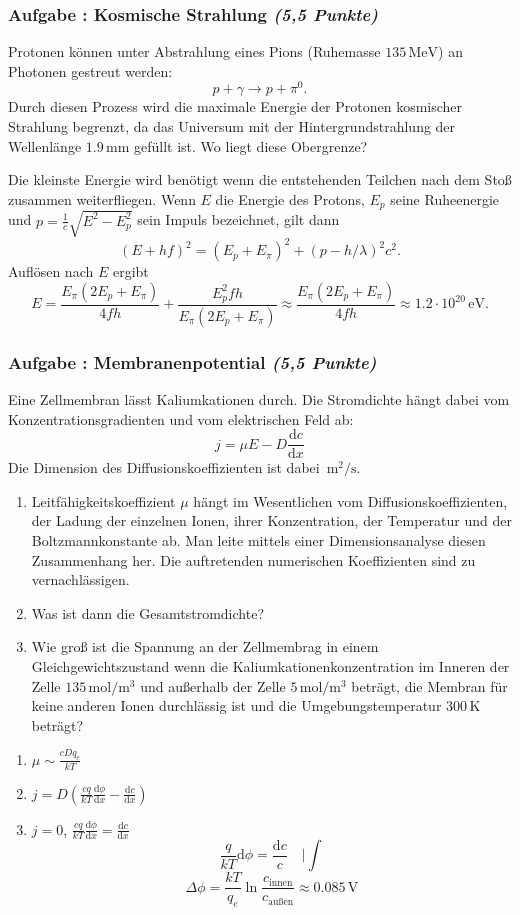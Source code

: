 \documentclass[12pt,a4paper]{article}
\newcommand{\ee}[1]{\cdot 10^{#1}}
\newcommand{\unit}[1]{\,\mathrm{#1}}
\newcommand{\dif}{\mathrm{d}}
\newcommand{\tdif}[2]{\frac{\dif#1}{\dif#2}}
\newenvironment{abcenum}{\renewcommand{\labelenumi}{(\alph{enumi})} \begin{enumerate}}{\end{enumerate}\renewcommand{\labelenumi}{\theenumi .}}
\newcounter{numlabel}
\newenvironment{problem}[2]{\stepcounter{numlabel} \vspace{1ex} \subsubsection*{Aufgabe \the\value{numlabel}: #1 \emph{(#2 Punkte)}} \renewcommand{\Currentlabel}{Aufgabe \the\value{numlabel}: #1}}{

}
\begin{document}
\begin{problem}{Kosmische Strahlung}{5,5}
Protonen können unter Abstrahlung eines Pions (Ruhemasse $135 \unit{MeV}$) an Photonen gestreut werden:
\[
p + \gamma \rightarrow p + \pi^0.
\]
Durch diesen Prozess wird die maximale Energie der Protonen kosmischer Strahlung begrenzt, da das Universum mit der Hintergrundstrahlung der Wellenlänge $1.9 \unit{mm}$ gefüllt ist. Wo liegt diese Obergrenze?

\begin{solution}
Die kleinste Energie wird benötigt wenn die entstehenden Teilchen nach dem Stoß zusammen weiterfliegen. Wenn $E$ die Energie des Protons, $E_p$ seine Ruheenergie und $p = \frac1c \sqrt{E^2 - E_p^2}$ sein Impuls bezeichnet, gilt dann
\[
(E+hf)^2 = (E_p + E_\pi)^2 + (p- h/\lambda)^2 c^2.
\]
Auflösen nach $E$ ergibt
\[
E = \frac{E_\pi (2 E_p + E_\pi)}{4 f h} + \frac{E_p^2 f h}{E_\pi (2 E_p +E_\pi)} \approx \frac{E_\pi (2 E_p + E_\pi)}{4 f h} \approx 1.2\ee{20} \unit{eV}.
\]
\end{solution}
\end{problem}


\begin{problem}{Membranenpotential}{5,5}
Eine Zellmembran lässt Kaliumkationen durch. Die Stromdichte hängt dabei vom Konzentrationsgradienten und vom elektrischen Feld ab:
\[
j = \mu E - D \tdif{c}{x}
\]
Die Dimension des Diffusionskoeffizienten ist dabei $\unit{m^2/s}$.
\begin{abcenum}
\item Leitfähigkeitskoeffizient $\mu$ hängt im Wesentlichen vom Diffusionskoeffizienten, der Ladung der einzelnen Ionen, ihrer Konzentration, der Temperatur und der Boltzmannkonstante ab. Man leite mittels einer Dimensionsanalyse diesen Zusammenhang her. Die auftretenden numerischen Koeffizienten sind zu vernachlässigen.
\item Was ist dann die Gesamtstromdichte?
\item Wie groß ist die Spannung an der Zellmembrag in einem Gleichgewichtszustand wenn die Kaliumkationenkonzentration im Inneren der Zelle $135 \unit{mol/m^3}$ und außerhalb der Zelle $5 \unit{mol/m^3}$ beträgt, die Membran für keine anderen Ionen durchlässig ist und die Umgebungstemperatur $300 \unit{K}$ beträgt?
\end{abcenum}

\begin{solution}
\begin{abcenum}
\item $\mu \sim \frac{cDq_e}{kT}$
\item $j = D \left( \frac{cq}{kT} \tdif{\phi}{x} - \tdif{c}{x} \right)$
\item $j=0$, $\frac{cq}{kT} \tdif{\phi}{x} = \tdif{c}{x}$
\[
\frac{q}{kT} \dif\phi = \frac{\dif c}{c} \quad | \int
\]
\[
\Delta \phi = \frac{kT}{q_e} \ln \frac{c_\mathrm{innen}}{c_\mathrm{außen}} \approx 0.085 \unit{V}
\]
\end{abcenum}
\end{solution}
\end{problem}
\end{document}
